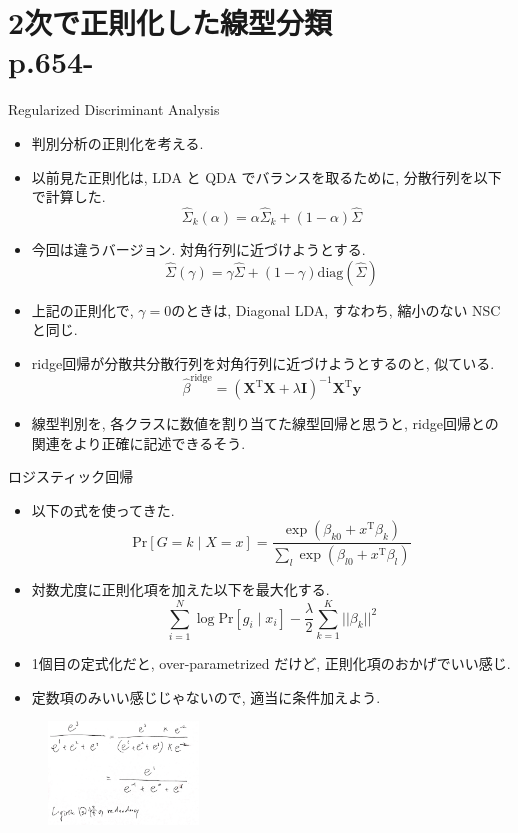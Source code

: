 \documentclass[dvipdfmx,8pt]{beamer}
\newcommand{\probability}[1]{\mathrm{Pr}[{#1}]}
\begin{document}
  \section{2次で正則化した線型分類\\p.654-}
  \begin{frame}{Regularized Discriminant Analysis}
    \begin{itemize}
      \item 判別分析の正則化を考える.
      \item 以前見た正則化は, LDA と QDA でバランスを取るために, 分散行列を以下で計算した.
        \[
          \hat{\Sigma}_k(\alpha)=\alpha\hat{\Sigma}_k+(1-\alpha)\hat{\Sigma}
        \]
      \item 今回は違うバージョン. 対角行列に近づけようとする.
        \[
          \hat{\Sigma}(\gamma)=\gamma\hat{\Sigma}+(1-\gamma)\mathrm{diag}(\hat{\Sigma})
        \]
      \item 上記の正則化で,  $\gamma=0$のときは, Diagonal LDA, すなわち, 縮小のない NSC と同じ.
      \item ridge回帰が分散共分散行列を対角行列に近づけようとするのと, 似ている.
        \[
          \hat{\beta}^{\mathrm{ridge}}=(\mathbf{X}^{\mathrm{T}}\mathbf{X}+\lambda\mathbf{I})^{-1}\mathbf{X}^{\mathrm{T}}\mathbf{y}
        \]
      \item 線型判別を, 各クラスに数値を割り当てた線型回帰と思うと, ridge回帰との関連をより正確に記述できるそう.
    \end{itemize}
  \end{frame}
  \begin{frame}{ロジスティック回帰}
    \begin{itemize}
      \item 以下の式を使ってきた.
        \[
          \probability{G=k \mid X=x}=\frac{\exp(\beta_{k0}+x^{\mathrm{T}}\beta_k)}{\sum_l\exp(\beta_{l0}+x^{\mathrm{T}}\beta_l)}
        \]
      \item 対数尤度に正則化項を加えた以下を最大化する.
        \[
          \sum_{i=1}^N\log \probability{g_i\mid x_i}-\frac{\lambda}{2}\sum_{k=1}^K||\beta_k||^2
        \]
      \item 1個目の定式化だと, over-parametrized だけど, 正則化項のおかげでいい感じ.
      \item 定数項のみいい感じじゃないので, 適当に条件加えよう.
    \end{itemize}
    \begin{figure}[htb]
      \centering
      \includegraphics[width=4cm]{./images/logistic-redundancy.jpg}
    \end{figure}
  \end{frame}
\end{document}
